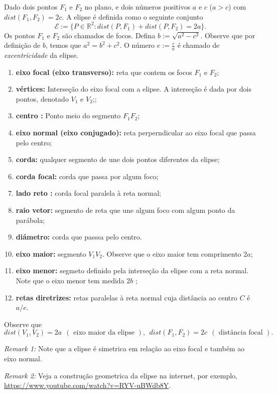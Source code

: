 \documentclass{article}
\begin{document}
 Dado dois pontos $F_1$ e $F_2$ no plano, e dois números positivos $a$ e $c$ ($a> c$)
   com $dist(F_1,F_2)=2c$.  
   A elipse é definida como o seguinte conjunto 
   $$\mathcal{E}:=\{P \in \mathbb{R}^{2}: dist(P,F_1)+dist(P,F_2)=2a\}.$$
   Os pontos $F_1$ e $F_2$ são chamados de focos.
   Defina $b:=\sqrt{a^{2}-c^{2}}$. 
   Observe que por definição de $b$, 
   temos que $a^{2}=b^2+c^2$. 
   O número $e:=\frac{c}{a}$ é chamado 
   de {\it excentricidade} da elipse.
    \begin{enumerate}
      \item {\bf eixo focal (eixo transverso): } reta que contem os focos $F_1$ e $F_2$;
      \item {\bf vértices: } Interseção do eixo focal com a elipse.   A interseção é dada por dois pontos, denotado $V_1$ e $V_2$;;
      \item {\bf centro : } Ponto meio do segmento $F_1F_2$;
      \item {\bf eixo normal (eixo conjugado): } reta perperndicular ao eixo focal que passa pelo centro; 
      \item {\bf corda: } qualquer segmento de une dois pontos diferentes da elipse;
      \item {\bf corda focal: } corda que passa por algum foco;
      \item {\bf lado reto : } corda focal paralela à reta normal;
      \item {\bf raio vetor: } segmento de reta que une algum 
      foco com algum ponto da parábola;
      \item {\bf diámetro: } corda que passsa pelo centro.
      \item {\bf eixo maior: } segmento $V_1V_2$. 
      Observe que o eixo maior tem comprimento $2a$;
      \item {\bf eixo menor: } segmeto definido pela interseção da elipse 
      com a reta normal. Note que o eixo menor tem medida $2b$ ;
      \item {\bf retas diretrizes: }  retas paralelas à reta normal 
      cuja distância ao centro $C$ é $a/e$.
     \end{enumerate}
     Observe que 
     $$ dist(V_1,V_2)=2a \ \ (\text{ eixo maior da elipse }), \ \ 
        dist(F_1,F_2)=2c \ \ (\text{ distância focal }).$$
 
 {\it Remark 1: }Note que a elipse é simetrica em relação ao eixo focal e também ao eixo normal. 
 
 {\it Remark 2: } Veja a 
 construção geometrica da elipse na internet, 
 por exemplo, 
 \url{https://www.youtube.com/watch?v=RYV-uBWdb8Y}.
  
\end{document}
